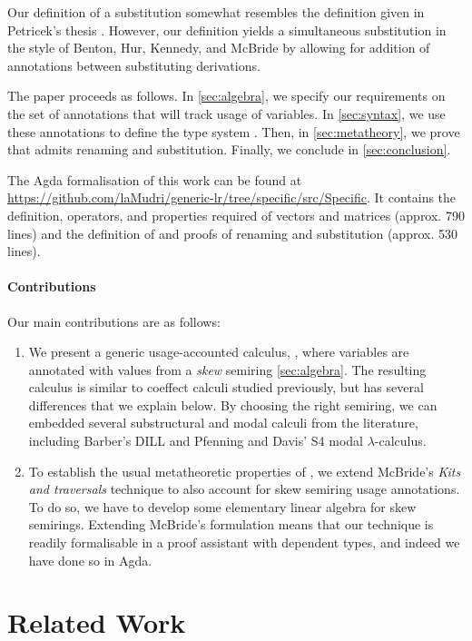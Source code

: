 \documentclass[submission,copyright,creativecommons]{eptcs}
\begin{document}
Our definition of a substitution somewhat resembles the definition given in
Petricek's thesis \cite[p. 137]{petricek-thesis}.
However, our definition yields a simultaneous substitution in the style of
Benton, Hur, Kennedy, and McBride \cite{bhkm12} by allowing for addition of
annotations between substituting derivations.

The paper proceeds as follows.
In \autoref{sec:algebra}, we specify our requirements on the set of annotations
that will track usage of variables.
In \autoref{sec:syntax}, we use these annotations to define the type system
\name{}.
Then, in \autoref{sec:metatheory}, we prove that \name{} admits renaming and
substitution.
Finally, we conclude in \autoref{sec:conclusion}.

The Agda formalisation of this work can be found at
\url{https://github.com/laMudri/generic-lr/tree/specific/src/Specific}.
It contains the definition, operators, and properties required of vectors and
matrices (approx. 790 lines) and the definition of \name{} and proofs of
renaming and substitution (approx. 530 lines).

\paragraph{Contributions} Our main contributions are as follows:
\begin{enumerate}
\item We present a generic usage-accounted calculus, \name{}, where
  variables are annotated with values from a \emph{skew} semiring
  \autoref{sec:algebra}. The resulting calculus is similar to coeffect
  calculi studied previously, but has several differences that we
  explain below. By choosing the right semiring, we can embedded
  several substructural and modal calculi from the literature,
  including Barber's DILL and Pfenning and Davis' S4 modal
  $\lambda$-calculus.
\item To establish the usual metatheoretic properties of \name{}, we
  extend McBride's \emph{Kits and traversals} technique to also
  account for skew semiring usage annotations. To do so, we have to
  develop some elementary linear algebra for skew semirings. Extending
  McBride's formulation means that our technique is readily
  formalisable in a proof assistant with dependent types, and indeed
  we have done so in Agda.
\end{enumerate}

\section{Related Work}
\end{document}
